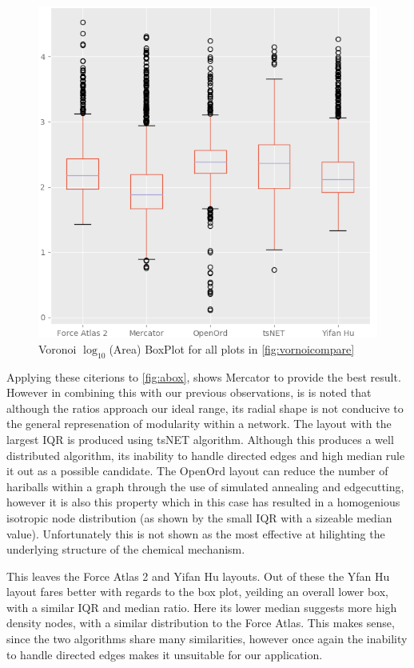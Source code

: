 \begin{figure}[H]
\centering \includegraphics[width=\textwidth]{figures_c1/area/log10layoutbox.png}
\caption{Voronoi $\log_{10}$(Area) BoxPlot for all plots in \autoref{fig:vornoicompare}}
\label{fig:abox}
\end{figure}


Applying these citerions to \autoref{fig:abox}, shows Mercator to provide the best result. However in combining this with our previous observations, is is noted that although the ratios approach our ideal range, its radial shape is not conducive to the general represenation of modularity within a network. The layout with the largest IQR is produced using tsNET algorithm. Although this produces a well distributed algorithm, its inability to handle directed edges and high median rule it out as a possible candidate. The OpenOrd layout can reduce the number of hariballs within a graph through the use of simulated annealing and edgecutting, however it is also this property which in this case has resulted in a homogenious isotropic node distribution (as shown by the small IQR with a sizeable median value). Unfortunately this is not shown as the most effective at hilighting the underlying structure of the chemical mechanism. 

This leaves the Force Atlas 2 and Yifan Hu layouts. Out of these the Yfan Hu layout fares better with regards to the box plot, yeilding an overall lower box, with a similar IQR and median ratio. Here its lower median suggests more high density nodes, with a similar distribution to the Force Atlas. This makes sense, since the two algorithms share many similarities, however once again the inability to handle directed edges makes it unsuitable for our application. 

